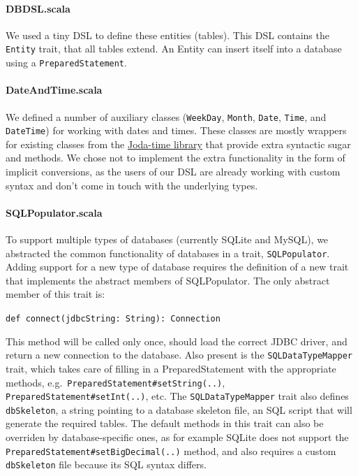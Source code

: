 \documentclass[a4paper]{article}
\newcommand{\cc}[1]{\texttt{#1}}
\renewcommand{\sc}[1]{\lstinline{#1}}
\begin{document}
\paragraph{DBDSL.scala}
We used a tiny DSL to define these entities (tables).
This DSL contains the \cc{Entity} trait, that all tables extend.
An Entity can insert itself into a database using a \cc{PreparedStatement}.

\paragraph{DateAndTime.scala}
We defined a number of auxiliary classes (\cc{WeekDay}, \cc{Month}, \cc{Date}, \cc{Time}, and \cc{DateTime}) for working with dates and times.
These classes are mostly wrappers for existing classes from the \href{http://joda-time.sourceforge.net/}{Joda-time library} that provide extra syntactic sugar and methods.
We chose not to implement the extra functionality in the form of implicit conversions, as the users of our DSL are already working with custom syntax and don't come in touch with the underlying types.

\paragraph{SQLPopulator.scala}
To support multiple types of databases (currently SQLite and MySQL), we abstracted the common functionality of databases in a trait, \cc{SQL\-Populator}.
Adding support for a new type of database requires the definition of a new trait that implements the abstract members of SQLPopulator.
The only abstract member of this trait is:

\sc{def connect(jdbcString: String): Connection}

This method will be called only once, should load the correct JDBC driver, and return a new connection to the database.
Also present is the \cc{SQLDataTypeMapper} trait, which takes care of filling in a PreparedStatement with the appropriate methods, e.g.\ \cc{Prepared\-State\-ment\-\#set\-String(..)}, \cc{Prepared\-State\-ment\-\#set\-Int(..)}, etc.
The \cc{SQLDataTypeMapper} trait also defines \sc{dbSkeleton}, a string pointing to a database skeleton file, an SQL script that will generate the required tables.
The default methods in this trait can also be overriden by database-specific ones, as for example SQLite does not support the \cc{Prepared\-State\-ment\-\#set\-Big\-Decimal(..)} method, and also requires a custom \sc{dbSkeleton} file because its SQL syntax differs.
\end{document}
